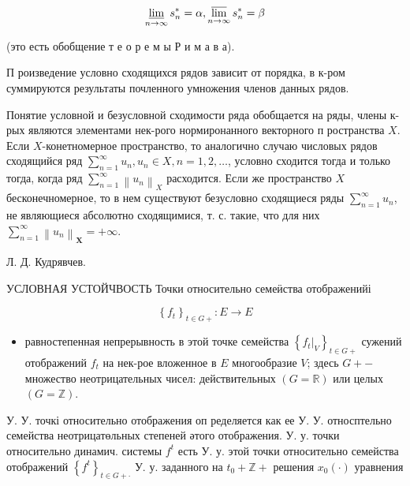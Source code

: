 \documentclass[10pt]{article}
\begin{document}
\[

\varliminf_{n \rightarrow \infty} s_{n}^{*}=\alpha, \varlimsup_{n \rightarrow \infty} s_{n}^{*}=\beta

\]



(это есть обобщение т е о р е м ы Р и м а в а).



П роизведение условно сходящихся рядов зависит от порядка, в к-ром суммируются результаты почленного умножения членов данных рядов.



Понятие условной и безусловной сходимости ряда обобщается на ряды, члены к-рых являются элементами нек-рого нормиронанного векторного п ространства $X$. Если $X$-конетномерное пространство, то аналогично случаю числовых рядов сходящийся ряд $\sum_{n=1}^{\infty} u_{n}, u_{n} \in X, n=1,2, \ldots$, условно сходится тогда и только тогда, когда ряд $\sum_{n=1}^{\infty}\left\|u_{n}\right\|_{X}$ расходится. Если же пространство $X$ бесконечномерное, то в нем существуют безусловно сходящиеся ряды $\sum_{n=1}^{\infty} u_{n}$, не являющиеся абсолютно сходящимися, т. с. такие, что для них $\sum_{n=1}^{\infty}\left\|u_{n}\right\|_{\boldsymbol{X}}=+\infty$.



Л. Д. Кудрявчев.



УСЛОВНАЯ УСТОЙЧВОСТЬ Точки относительно семеӥства отображенийі



\[

\left\{f_{t}\right\}_{t \in G+}: E \longrightarrow E

\]



\begin{itemize}

  \item равностепенная непрерывность в этой точке семейства $\left\{\left.f_{t}\right|_{V}\right\}_{t \in G+}$ сужений отображений $f_{t}$ на нек-рое вложенное в $E$ многообразие $V$; здесь $G+-$ множество неотрицательных чисел: действительных $(G=\mathbb{R})$ или целых $(G=\mathbb{Z})$.

\end{itemize}



У. У. точкі относительно отображения оп ределяется как ее У. У. относптельно семейства неотрицатөльных степеней әтого отображения. У. у. точки относительно динамич. системы $f^{t}$ есть У. у. этой точки относительно семейства отображений $\left\{f^{t}\right\}_{t \in G+\cdot}$ У. у. заданного на $t_{0}+\mathbb{Z}+$ решения $x_{0}(\cdot)$ уравнения
\end{document}
